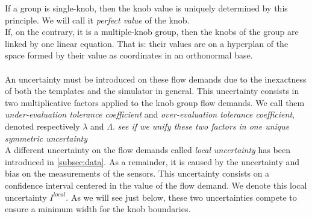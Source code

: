 If a group is single-knob, then the knob value is uniquely determined by this principle. We will call it \emph{perfect value} of the knob.\\
If, on the contrary, it is a multiple-knob group, then the knobs of the group are linked by one linear equation. That is: their values are on a hyperplan of the space formed by their value as coordinates in an orthonormal base.\\
\\
An uncertainty must be introduced on these flow demands due to the inexactness of both the templates and the simulator in general. This uncertainty consists in two multiplicative factors applied to the knob group flow demands. We call them \emph{under-evaluation tolerance coefficient} and \emph{over-evaluation tolerance coefficient}, denoted respectively $\lambda$ and $\Lambda$.\emph{ see if we unify these two factors in one unique symmetric uncertainty}\\
A different uncertainty on the flow demands called \emph{local uncertainty} has been introduced in \ref{subsec:data}. As a remainder, it is caused by the uncertainty and bias on the measurements of the sensors. This uncertainty consists on a confidence interval centered in the value of the flow demand. We denote this local uncertainty $I^{local}$.
As we will see just below, these two uncertainties compete to ensure a minimum width for the knob boundaries.
\\
\\
\\
\\
\\
